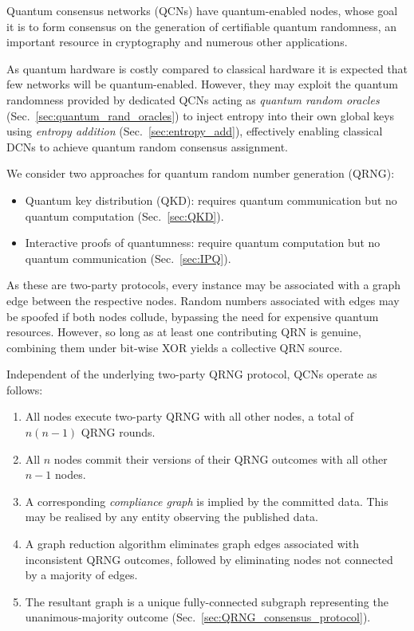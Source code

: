 Quantum consensus networks (QCNs) have quantum-enabled nodes, whose goal it is to form consensus on the generation of certifiable quantum randomness, an important resource in cryptography and numerous other applications.

As quantum hardware is costly compared to classical hardware it is expected that few networks will be quantum-enabled. However, they may exploit the quantum randomness provided by dedicated QCNs acting as \emph{quantum random oracles} (Sec.~\ref{sec:quantum_rand_oracles}) to inject entropy into their own global keys using \emph{entropy addition} (Sec.~\ref{sec:entropy_add}), effectively enabling classical DCNs to achieve quantum random consensus assignment.

We consider two approaches for quantum random number generation (QRNG):
\begin{itemize}
	\item Quantum key distribution (QKD): requires quantum communication but no quantum computation (Sec.~\ref{sec:QKD}).
	\item Interactive proofs of quantumness: require quantum computation but no quantum communication (Sec.~\ref{sec:IPQ}).
\end{itemize}

As these are two-party protocols, every instance may be associated with a graph edge between the respective nodes. Random numbers associated with edges may be spoofed if both nodes collude, bypassing the need for expensive quantum resources. However, so long as at least one contributing QRN is genuine, combining them under bit-wise XOR yields a collective QRN source.

Independent of the underlying two-party QRNG protocol, QCNs operate as follows:
\begin{enumerate}
	\item All nodes execute two-party QRNG with all other nodes, a total of $n(n-1)$ QRNG rounds.
	\item All $n$ nodes commit their versions of their QRNG outcomes with all other $n-1$ nodes.
	\item A corresponding \emph{compliance graph} is implied by the committed data. This may be realised by any entity observing the published data.
	\item A graph reduction algorithm eliminates  graph edges associated with inconsistent QRNG outcomes, followed by eliminating nodes not connected by a majority of edges.
	\item The resultant graph is a unique fully-connected subgraph representing the unanimous-majority outcome (Sec.~\ref{sec:QRNG_consensus_protocol}).
\end{enumerate}


